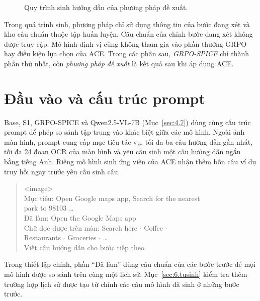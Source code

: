 \begin{figure}[!htb]
\caption{Quy trình sinh hướng dẫn của phương pháp đề xuất.}
\label{fig:4.1}
\end{figure}

Trong quá trình sinh, phương pháp chỉ sử dụng thông tin của bước đang xét và kho câu chuẩn thuộc tập huấn luyện. Câu chuẩn của chính bước đang xét không được truy cập. Mô hình định vị cũng không tham gia vào phần thưởng GRPO hay điều kiện lựa chọn của ACE. Trong các phần sau, \emph{GRPO-SPICE} chỉ thành phần thứ nhất, còn \emph{phương pháp đề xuất} là kết quả sau khi áp dụng ACE.

\section{Đầu vào và cấu trúc prompt}\label{sec:4.2}

Base, S1, GRPO-SPICE và Qwen2.5-VL-7B (Mục~\ref{sec:4.7}) dùng cùng cấu trúc prompt để phép so sánh tập trung vào khác biệt giữa các mô hình. Ngoài ảnh màn hình, prompt cung cấp mục tiêu tác vụ, tối đa ba câu hướng dẫn gần nhất, tối đa 24 đoạn OCR của màn hình và yêu cầu sinh một câu hướng dẫn ngắn bằng tiếng Anh. Riêng mô hình sinh ứng viên của ACE nhận thêm bốn câu ví dụ truy hồi ngay trước yêu cầu sinh câu.

\begin{quote}\ttfamily\footnotesize
<image>\\
Mục tiêu: Open Google maps app, Search for the nearest\\
\hspace*{1em}park to 98103 \ldots\\
Đã làm: Open the Google Maps app\\
Chữ đọc được trên màn: Search here $\cdot$ Coffee $\cdot$\\
\hspace*{1em}Restaurants $\cdot$ Groceries $\cdot$ \ldots\\
Viết câu hướng dẫn cho bước tiếp theo.
\end{quote}

Trong thiết lập chính, phần “Đã làm” dùng câu chuẩn của các bước trước để mọi mô hình được so sánh trên cùng một lịch sử. Mục~\ref{sec:6.tusinh} kiểm tra thêm trường hợp lịch sử được tạo từ chính các câu mô hình đã sinh ở những bước trước.

